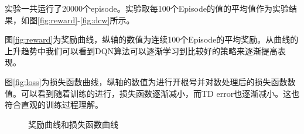 \documentclass{article}
\begin{document}
        实验一共运行了20000个episode。实验取每100个Episode的值的平均值作为实验结果，如图\ref{fig:reward}-\ref{fig:dcw}所示。

        图\ref{fig:reward}为奖励曲线，纵轴的数值为连续100个Episode的平均奖励。从曲线的上升趋势中我们可以看到DQN算法可以逐渐学习到比较好的策略来逐渐提高表现。

        图\ref{fig:loss}为损失函数曲线，纵轴的数值为进行开根号并对数处理后的损失函数数值。可以看到随着训练的进行，损失函数逐渐减小，而TD error也逐渐减小。这也符合直观的训练过程理解。

        \begin{figure}[htb]
            \centering
            \caption{奖励曲线和损失函数曲线}
        \end{figure}
        
\end{document}
